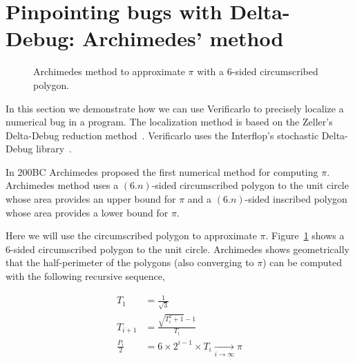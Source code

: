 \section{Pinpointing bugs with Delta-Debug: Archimedes' method}

\begin{figure}[h]
  \centering
  \caption{Archimedes method to approximate $\pi$ with a 6-sided circumscribed polygon.
    \label{fig:archimedes}
  }
\end{figure}

In this section we demonstrate how we can use Verificarlo to precisely localize a numerical bug in a program. The localization method is based on the Zeller's Delta-Debug reduction method~\cite{zeller2001automated}. Verificarlo uses the Interflop's stochastic Delta-Debug library~\cite{verrou,interflop}.

In 200BC Archimedes proposed the first numerical method for computing $\pi$.
Archimedes method uses a $(6.n)$-sided circumscribed polygon to the unit circle
whose area provides an upper bound for $\pi$ and a $(6.n)$-sided inscribed polygon
whose area provides a lower bound for $\pi$.

Here we will use the circumscribed polygon to approximate $\pi$.
Figure~\ref{fig:archimedes} shows a 6-sided circumscribed polygon to the unit
circle. Archimedes shows geometrically that the half-perimeter of the polygons (also converging to $\pi$) can be computed with the following recursive sequence,

\begin{align*}
  T_1             & = \frac{1}{\sqrt{3}}                                             \\
  T_{i+1}         & = \frac{\sqrt{T_i^2+1} - 1}{T_i}                                 \\
  \frac{P_{i}}{2} & = 6 \times 2^{i-1} \times T_{i} \xrightarrow[i \to \infty]{} \pi
\end{align*}

